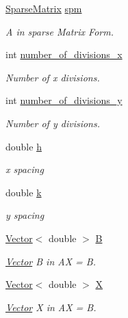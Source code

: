 \begin{DoxyCompactItemize}
\item 
\hyperlink{class_sparse_matrix}{Sparse\+Matrix} \hyperlink{class_compute_matrix_adfd277a6083ab558b0d5dc2fc5ff5230}{spm}
\begin{DoxyCompactList}\small\item\em A in sparse Matrix Form. \end{DoxyCompactList}\item 
int \hyperlink{class_compute_matrix_a0734d77fb41d28f70ead13cf77c6b1d8}{number\+\_\+of\+\_\+divisions\+\_\+x}
\begin{DoxyCompactList}\small\item\em Number of x divisions. \end{DoxyCompactList}\item 
int \hyperlink{class_compute_matrix_a5e5eb85861b987d80caf668424f26046}{number\+\_\+of\+\_\+divisions\+\_\+y}
\begin{DoxyCompactList}\small\item\em Number of y divisions. \end{DoxyCompactList}\item 
double \hyperlink{class_compute_matrix_ae43490e192b2e3ea685e7cf7c35186a8}{h}
\begin{DoxyCompactList}\small\item\em x spacing \end{DoxyCompactList}\item 
double \hyperlink{class_compute_matrix_ae498ccb8e95e23dcf562c310fba18b6c}{k}
\begin{DoxyCompactList}\small\item\em y spacing \end{DoxyCompactList}\item 
\hyperlink{class_vector}{Vector}$<$ double $>$ \hyperlink{class_compute_matrix_a95446381371c34e298a9483ae9264a19}{B}
\begin{DoxyCompactList}\small\item\em \hyperlink{class_vector}{Vector} B in A\+X = B. \end{DoxyCompactList}\item 
\hyperlink{class_vector}{Vector}$<$ double $>$ \hyperlink{class_compute_matrix_a7dab716b72de86553d960aead1497bdf}{X}
\begin{DoxyCompactList}\small\item\em \hyperlink{class_vector}{Vector} X in A\+X = B. \end{DoxyCompactList}\item 

\end{DoxyCompactItemize}
